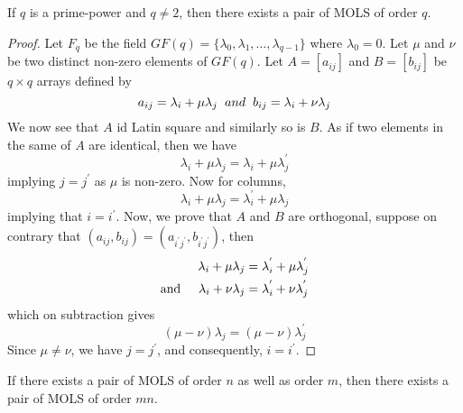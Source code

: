\documentclass[../main.tex]{subfiles}
\begin{document}
\begin{thm}\label{thm_prm.pwr_ls}
	If $q$ is a prime-power and $q\neq 2$, then there exists a pair of MOLS of order $q$.
\end{thm}

\begin{proof}
	Let $F_q$ be the field $GF(q) = \{ \lambda_0 , \lambda_1 , \ldots , \lambda_{q-1} \}$ where $\lambda_0 = 0$. Let $\mu$ and $\nu$ be two distinct non-zero elements of $GF(q)$. Let $A=[a_{ij}]$ and $B=[b_{ij}]$ be $q\times q$ arrays defined by 
	\[
		a_{ij} = \lambda_i + \mu \lambda_j
		\hspace{2mm}
		and
		\hspace{2mm}
		b_{ij} = \lambda_i + \nu \lambda_j
	\]
	We now see that $A$ id Latin square and similarly so is $B$. As if two elements in the same of $A$ are identical, then we have
	\[
		\lambda_i + \mu \lambda_j = \lambda_i + \mu \lambda_j^{'}
	\]
	 implying $j = j^{'}$ as $\mu$ is non-zero. Now for columns, 
	 \[
	 	\lambda_i + \mu \lambda_j = \lambda_i^{'} + \mu \lambda_j
	 \]
	 implying that $i = i^{'}$.
	 Now, we prove that $A$ and $B$ are orthogonal, suppose on contrary that $(a_{ij},b_{ij})=(a_{i^{'}j^{'}},b_{i^{'}j^{'}})$, then
	 \begin{align*}
		 \lambda_i + \mu \lambda_j &= \lambda_i^{'} + \mu \lambda_j^{'}\\
		 \text{and} \hspace{5mm} \lambda_i + \nu \lambda_j &= \lambda_i^{'} + \nu \lambda_j^{'}\\	 	
	\end{align*}
	which on subtraction gives
	\[
		(\mu - \nu)\lambda_j = (\mu - \nu)\lambda_j^{'}
	\]	  
	Since $\mu \neq \nu$, we have $j = j^{'}$, and consequently, $i=i^{'}$. 
\end{proof}

\begin{thm}\label{thm_mn_ls}
	If there exists a pair of MOLS of order $n$ as well as order $m$, then there exists a pair of MOLS of order $mn$. 
\end{thm}
\end{document}
